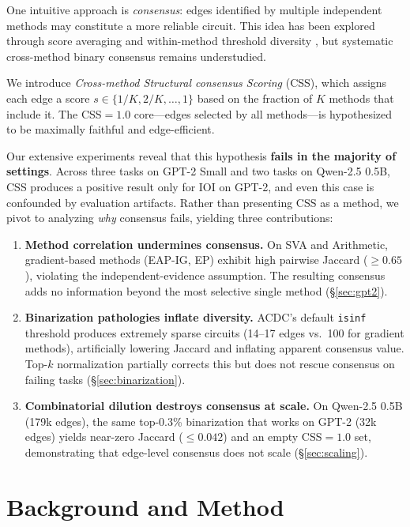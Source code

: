 \documentclass[11pt,a4paper]{article}
\newcommand{\css}{\textsc{CSS}}
\newcommand{\circus}{\textsc{Circus}}
\newcommand{\eapig}{\textsc{EAP-IG}}
\newcommand{\ep}{\textsc{EP}}
\newcommand{\acdc}{\textsc{ACDC}}
\begin{document}
One intuitive approach is \emph{consensus}: edges identified by multiple independent methods may constitute a more reliable circuit.
This idea has been explored through score averaging \citep{mondorf2025beyond} and within-method threshold diversity \citep[\circus{};][]{parekh2026circus}, but systematic cross-method binary consensus remains understudied.

We introduce \emph{Cross-method Structural consensus Scoring} (\css{}), which assigns each edge a score $s \in \{1/K, 2/K, \ldots, 1\}$ based on the fraction of $K$ methods that include it.
The \css{}$= 1.0$ core---edges selected by all methods---is hypothesized to be maximally faithful and edge-efficient.

Our extensive experiments reveal that this hypothesis \textbf{fails in the majority of settings}.
Across three tasks on GPT-2 Small and two tasks on Qwen-2.5 0.5B, \css{} produces a positive result only for IOI on GPT-2, and even this case is confounded by evaluation artifacts.
Rather than presenting \css{} as a method, we pivot to analyzing \emph{why} consensus fails, yielding three contributions:

\begin{enumerate}
    \item \textbf{Method correlation undermines consensus.} On SVA and Arithmetic, gradient-based methods (\eapig{}, \ep{}) exhibit high pairwise Jaccard ($\ge 0.65$), violating the independent-evidence assumption. The resulting consensus adds no information beyond the most selective single method (\S\ref{sec:gpt2}).
    \item \textbf{Binarization pathologies inflate diversity.} \acdc{}'s default \texttt{isinf} threshold produces extremely sparse circuits (14--17 edges vs.\ 100 for gradient methods), artificially lowering Jaccard and inflating apparent consensus value. Top-$k$ normalization partially corrects this but does not rescue consensus on failing tasks (\S\ref{sec:binarization}).
    \item \textbf{Combinatorial dilution destroys consensus at scale.} On Qwen-2.5 0.5B (179k edges), the same top-0.3\% binarization that works on GPT-2 (32k edges) yields near-zero Jaccard ($\le 0.042$) and an empty \css{}$= 1.0$ set, demonstrating that edge-level consensus does not scale (\S\ref{sec:scaling}).
\end{enumerate}

\section{Background and Method}
\label{sec:method}
\end{document}
